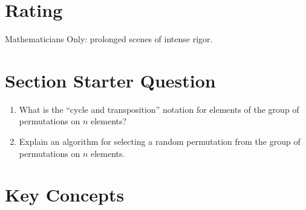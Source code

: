 \documentclass[12pt]{article}
\begin{document}
\myheader \mytitle

\hr


\hr

\usefirefox

\hr



\section*{Rating} %
Mathematicians Only:  prolonged scenes of intense rigor.

\hr

\section*{Section Starter Question}
\begin{enumerate}
    \item
        What is the ``cycle and transposition'' notation for elements of
        the group of permutations on \( n \) elements?
    \item
        Explain an algorithm for selecting a random permutation from the
        group of permutations on \( n \) elements.
\end{enumerate}

\hr

\section*{Key Concepts}
\end{document}
